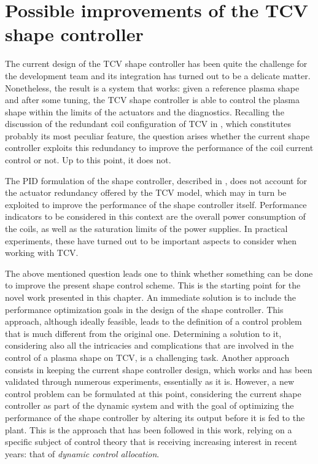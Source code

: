 \section{Possible improvements of the TCV shape controller}
\label{sec:tcvshapectrl_limitations}
The current design of the TCV shape controller has been quite the challenge for the development team and its integration has turned out to be a delicate matter. Nonetheless, the result is a system that works: given a reference plasma shape and after some tuning, the TCV shape controller is able to control the plasma shape within the limits of the actuators and the diagnostics. Recalling the discussion of the redundant coil configuration of TCV in , which constitutes probably its most peculiar feature, the question arises whether the current shape controller exploits this redundancy to improve the performance of the coil current control or not. Up to this point, it does not.

The PID formulation of the shape controller, described in \cite{mele_design_2024}, does not account for the actuator redundancy offered by the TCV model, which may in turn be exploited to improve the performance of the shape controller itself. Performance indicators to be considered in this context are the overall power consumption of the coils, as well as the saturation limits of the power supplies. In practical experiments, these have turned out to be important aspects to consider when working with TCV.

The above mentioned question leads one to think whether something can be done to improve the present shape control scheme. This is the starting point for the novel work presented in this chapter. An immediate solution is to include the performance optimization goals in the design of the shape controller. This approach, although ideally feasible, leads to the definition of a control problem that is much different from the original one. Determining a solution to it, considering also all the intricacies and complications that are involved in the control of a plasma shape on TCV, is a challenging task. Another approach consists in keeping the current shape controller design, which works and has been validated through numerous experiments, essentially as it is. However, a new control problem can be formulated at this point, considering the current shape controller as part of the dynamic system and with the goal of optimizing the performance of the shape controller by altering its output before it is fed to the plant. This is the approach that has been followed in this work, relying on a specific subject of control theory that is receiving increasing interest in recent years: that of \emph{dynamic control allocation}.

